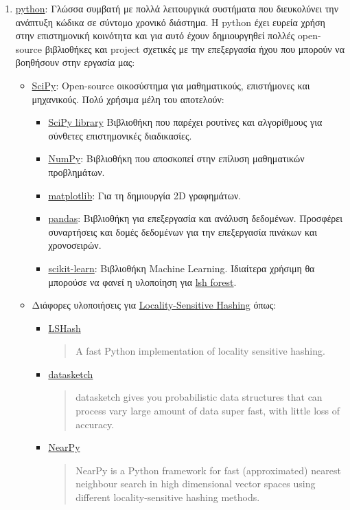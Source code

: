 \begin{enumerate}
    \item \href{https://www.python.org/}{python}:
    Γλώσσα συμβατή με πολλά λειτουργικά συστήματα που διευκολύνει την ανάπτυξη κώδικα σε σύντομο χρονικό διάστημα.
    Η python έχει ευρεία χρήση στην επιστημονική κοινότητα και για αυτό έχουν δημιουργηθεί πολλές open-source βιβλιοθήκες και project σχετικές με την επεξεργασία ήχου που μπορούν να βοηθήσουν στην εργασία μας:
    \begin{itemize}
        \item \href{https://www.scipy.org/}{SciPy}:
        Open-source οικοσύστημα για μαθηματικούς, επιστήμονες και μηχανικούς.
        Πολύ χρήσιμα μέλη του αποτελούν:
        \begin{itemize}
        \item \href{https://www.scipy.org/scipylib/index.html}{SciPy library}
        Βιβλιοθήκη που παρέχει ρουτίνες και αλγορίθμους για σύνθετες επιστημονικές διαδικασίες.
        \item \href{http://www.numpy.org/}{NumPy}:
        Βιβλιοθήκη που αποσκοπεί στην επίλυση μαθηματικών προβλημάτων.
        \item \href{http://matplotlib.org/}{matplotlib}:
        Για τη δημιουργία 2D γραφημάτων.
        \item \href{http://pandas.pydata.org/}{pandas}:
        Βιβλιοθήκη για επεξεργασία και ανάλυση δεδομένων.
        Προσφέρει συναρτήσεις και δομές δεδομένων για την επεξεργασία πινάκων και χρονοσειρών.
        \item \href{http://scikit-learn.org/stable/}{scikit-learn}:
        Βιβλιοθήκη Machine Learning.
        Ιδιαίτερα χρήσιμη θα μπορούσε να φανεί η υλοποίηση για \href{http://scikit-learn.org/stable/modules/generated/sklearn.neighbors.LSHForest.html#sklearn.neighbors.LSHForest}{lsh forest}.
        \end{itemize}

        \item Διάφορες υλοποιήσεις για \hyperref[sub:lsh]{Locality-Sensitive Hashing} όπως:
        \begin{itemize}
        \item \href{https://github.com/kayzhu/LSHash}{LSHash}
        \blockquote{A fast Python implementation of locality sensitive hashing.}
        \item \href{https://github.com/ekzhu/datasketch}{datasketch}
        \blockquote{datasketch gives you probabilistic data structures that can process vary large amount of data super fast, with little loss of accuracy.}
        \item \href{https://github.com/pixelogik/NearPy}{NearPy}
        \blockquote{NearPy is a Python framework for fast (approximated) nearest neighbour search in high dimensional vector spaces using different locality-sensitive hashing methods.}
        \end{itemize}


\end{itemize}
\end{enumerate}
